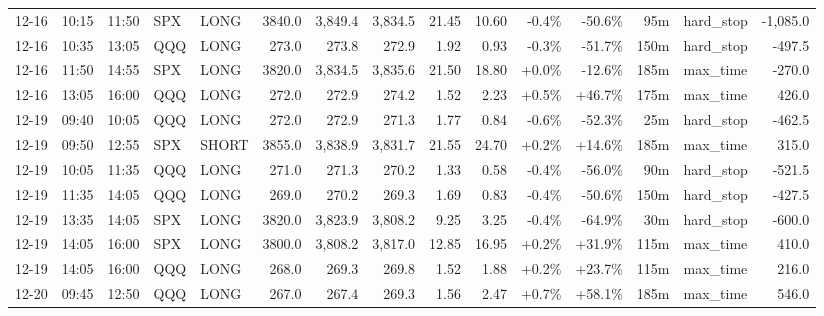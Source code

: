 \documentclass[11pt,a4paper,twoside]{article}
\begin{document}
\begin{landscape}
\begin{center}
\begin{longtable}{>{\color{txtmain}}l l l l l r r r r r r r r >{\color{txtmain}}l r}
12-16 & 10:15 & 11:50 & SPX & LONG & 3840.0 & 3,849.4 & 3,834.5 & 21.45 & 10.60 & \textcolor{lossred}{-0.4\%} & \textcolor{lossred}{-50.6\%} & 95m & hard\_stop & \textcolor{lossred}{-1,085.0} \\
12-16 & 10:35 & 13:05 & QQQ & LONG & 273.0 & 273.8 & 272.9 & 1.92 & 0.93 & \textcolor{lossred}{-0.3\%} & \textcolor{lossred}{-51.7\%} & 150m & hard\_stop & \textcolor{lossred}{-497.5} \\
12-16 & 11:50 & 14:55 & SPX & LONG & 3820.0 & 3,834.5 & 3,835.6 & 21.50 & 18.80 & \textcolor{wingreen}{+0.0\%} & \textcolor{lossred}{-12.6\%} & 185m & max\_time & \textcolor{lossred}{-270.0} \\
12-16 & 13:05 & 16:00 & QQQ & LONG & 272.0 & 272.9 & 274.2 & 1.52 & 2.23 & \textcolor{wingreen}{+0.5\%} & \textcolor{wingreen}{+46.7\%} & 175m & max\_time & \textcolor{wingreen}{426.0} \\
12-19 & 09:40 & 10:05 & QQQ & LONG & 272.0 & 272.9 & 271.3 & 1.77 & 0.84 & \textcolor{lossred}{-0.6\%} & \textcolor{lossred}{-52.3\%} & 25m & hard\_stop & \textcolor{lossred}{-462.5} \\
12-19 & 09:50 & 12:55 & SPX & SHORT & 3855.0 & 3,838.9 & 3,831.7 & 21.55 & 24.70 & \textcolor{wingreen}{+0.2\%} & \textcolor{wingreen}{+14.6\%} & 185m & max\_time & \textcolor{wingreen}{315.0} \\
12-19 & 10:05 & 11:35 & QQQ & LONG & 271.0 & 271.3 & 270.2 & 1.33 & 0.58 & \textcolor{lossred}{-0.4\%} & \textcolor{lossred}{-56.0\%} & 90m & hard\_stop & \textcolor{lossred}{-521.5} \\
12-19 & 11:35 & 14:05 & QQQ & LONG & 269.0 & 270.2 & 269.3 & 1.69 & 0.83 & \textcolor{lossred}{-0.4\%} & \textcolor{lossred}{-50.6\%} & 150m & hard\_stop & \textcolor{lossred}{-427.5} \\
12-19 & 13:35 & 14:05 & SPX & LONG & 3820.0 & 3,823.9 & 3,808.2 & 9.25 & 3.25 & \textcolor{lossred}{-0.4\%} & \textcolor{lossred}{-64.9\%} & 30m & hard\_stop & \textcolor{lossred}{-600.0} \\
12-19 & 14:05 & 16:00 & SPX & LONG & 3800.0 & 3,808.2 & 3,817.0 & 12.85 & 16.95 & \textcolor{wingreen}{+0.2\%} & \textcolor{wingreen}{+31.9\%} & 115m & max\_time & \textcolor{wingreen}{410.0} \\
12-19 & 14:05 & 16:00 & QQQ & LONG & 268.0 & 269.3 & 269.8 & 1.52 & 1.88 & \textcolor{wingreen}{+0.2\%} & \textcolor{wingreen}{+23.7\%} & 115m & max\_time & \textcolor{wingreen}{216.0} \\
12-20 & 09:45 & 12:50 & QQQ & LONG & 267.0 & 267.4 & 269.3 & 1.56 & 2.47 & \textcolor{wingreen}{+0.7\%} & \textcolor{wingreen}{+58.1\%} & 185m & max\_time & \textcolor{wingreen}{546.0} \\

\end{longtable}
\end{center}
\end{landscape}
\end{document}
